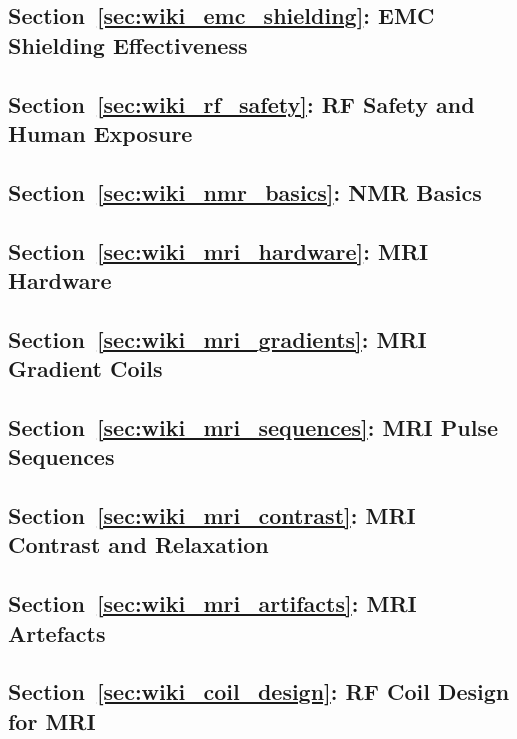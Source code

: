 
\subsection*{Section~\ref{sec:wiki_emc_shielding}: EMC Shielding Effectiveness}

\subsection*{Section~\ref{sec:wiki_rf_safety}: RF Safety and Human Exposure}

\subsection*{Section~\ref{sec:wiki_nmr_basics}: NMR Basics}

\subsection*{Section~\ref{sec:wiki_mri_hardware}: MRI Hardware}

\subsection*{Section~\ref{sec:wiki_mri_gradients}: MRI Gradient Coils}

\subsection*{Section~\ref{sec:wiki_mri_sequences}: MRI Pulse Sequences}

\subsection*{Section~\ref{sec:wiki_mri_contrast}: MRI Contrast and Relaxation}

\subsection*{Section~\ref{sec:wiki_mri_artifacts}: MRI Artefacts}

\subsection*{Section~\ref{sec:wiki_coil_design}: RF Coil Design for MRI}

